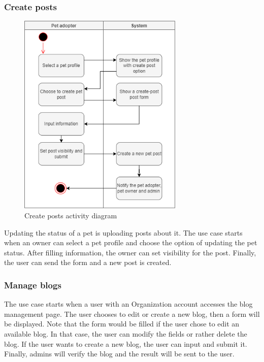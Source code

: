 \subsubsection*{Create posts}

\begin{figure}[H]
  \centering
  \includegraphics[width=0.7\textwidth]{Figures/create-pet-post.png}
  \caption{Create posts activity diagram}
  \label{fig:create-post}
\end{figure}

Updating the status of a pet is uploading posts about it. The use case starts when an owner can select a pet profile and choose the option of updating the pet status. After filling information, the owner can set visibility for the post. Finally, the user can send the form and a new post is created.


\subsubsection{Manage blogs}

The use case starts when a user with an Organization account accesses the blog management page. The user chooses to edit or create a new blog, then a form will be displayed. Note that the form would be filled if the user chose to edit an available blog. In that case, the user can modify the fields or rather delete the blog. If the user wants to create a new blog, the user can input and submit it. Finally, admins will verify the blog and the result will be sent to the user.

